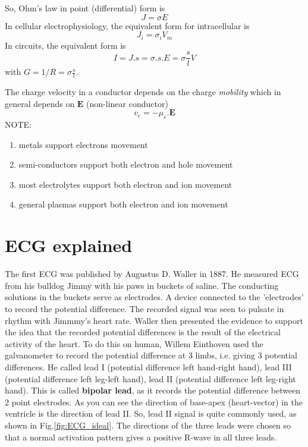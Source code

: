So, Ohm's law in point (differential) form is
\begin{equation}
J = \sigma E
\end{equation}
In cellular electrophysiology, the equivalent form for intracellular is
\begin{equation}
J_i = \sigma_i V_m
\end{equation}
In circuits, the equivalent form is
\begin{equation}
I = J.s = \sigma .s. E = \sigma\frac{s}{l}V
\end{equation}
with $G=1/R = \sigma\frac{s}{l}$. 

The charge velocity in a conductor depends on the charge {\it mobility} which
in general depends on $\mathbf{E}$ (non-linear conductor)
\begin{equation}
v_e = -\mu_e . \mathbf{E}
\end{equation}
NOTE: 
\begin{enumerate}
  \item metals support electrons movement
  \item semi-conductors support both electron and hole movement
  \item most electrolytes support both electron and ion movement
  \item general plasmas support both electron and ion movement
\end{enumerate}


% 
% 

\section{ECG explained}

The first ECG was published by Augustus D. Waller in 1887. He measured ECG from
his bulldog Jimmy with his paws in buckets of saline. The conducting solutions
in the buckets serve as electrodes. A device connected to the 'electrodes' to
record the potential difference. The recorded signal was seen to pulsate in
rhythm with Jimmmy's heart rate. Waller then presented the evidence to support
the idea that the recorded potential differences is the result of the electrical
activity of the heart. To do this on human, Willem Einthoven used the
galvanometer to record the potential difference at 3 limbs, i.e. giving 3
potential differences. He called lead I (potential difference left
hand-right hand), lead III (potential difference left leg-left hand), lead
II (potential difference left leg-right hand). This is called {\bf bipolar
lead}, as it records the potential difference between 2 point electrodes. As you
can see the direction of base-apex (heart-vector) in the ventricle is the
direction of lead II. So, lead II signal is quite commonly used, as shown in
Fig.\ref{fig:ECG_ideal}.  The directions of the three leads were chosen so that
a normal activation pattern gives a positive R-wave in all three leads.

